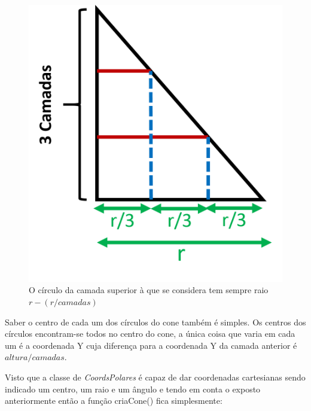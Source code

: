 \begin{figure}[<+htpb+>]
	\centering
	\includegraphics[scale=0.5]{imagens/p3_conePerfil.png}
	\caption{O círculo da camada superior à que se considera tem sempre raio $r - (r/camadas)$}
	\label{p1:fig:p3_conePerfil}
\end{figure}

Saber o centro de cada um dos círculos do cone também é simples. Os centros dos círculos encontram-se todos no centro do cone, a única coisa que varia em cada um é a coordenada Y cuja diferença para a coordenada Y da camada anterior é $altura / camadas$.

Visto que a classe de \textit{CoordsPolares} é capaz de dar coordenadas cartesianas sendo indicado um centro, um raio e um ângulo e tendo em conta o exposto anteriormente então a função criaCone() fica simplesmente:

